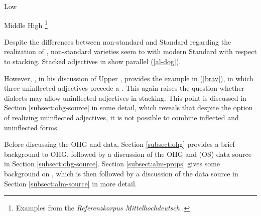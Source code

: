 \documentclass[output=paper,colorlinks,citecolor=brown]{langscibook}
\begin{document}
\ea Low  \label{lg-big}
\z
\z 

\ea Middle High \label{mhg}\footnote{Examples from the \textit{Referenzkorpus Mittelhochdeutsch} \citep{ReM}.}
\z
\z 

Despite the differences between non-standard and Standard  regarding the realization of , non-standard varieties seem to  with modern Standard  with respect to stacking. Stacked adjectives in  show parallel  (\ref{al-dog}).

\ea {} \label{al-dog}
\z
\z 

However, \citet[213]{adelung1781deutsche}, in his discussion of Upper  , provides the example in (\ref{brav}), in which three uninflected adjectives precede a . This again raises the question whether dialects may allow uninflected adjectives in stacking. This point is discussed in Section \ref{subsect:ohg-source} in some detail, which reveals that despite the option of realizing uninflected adjectives, it is not possible to combine inflected and uninflected forms.

\z

Before discussing the OHG and  data, Section \ref{subsect:ohg} provides a brief background to OHG, followed by a discussion of the OHG and  (OS) data source in Section \ref{subsect:ohg-source}. Section \ref{subsect:alm-props} gives some background on , which is then followed by a discussion of the  data source in Section \ref{subsect:alm-source} in more detail.
\end{document}
